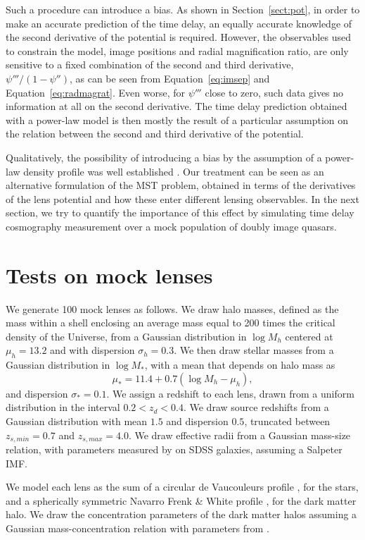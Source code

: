 \documentclass[usenatbib]{mnras}
\def\psiii{\psi''}
\def\psiiii{\psi'''}
\def\Sref#1{Section~\ref{#1}\xspace}
\def\Eref#1{Equation~\ref{#1}\xspace}
\begin{document}
Such a procedure can introduce a bias. As shown in \Sref{sect:pot}, in order to make an accurate prediction of the time delay, an equally accurate knowledge of the second derivative of the potential is required. However, the observables used to constrain the model, image positions and radial magnification ratio, are only sensitive to a fixed combination of the second and third derivative, $\psiiii/(1-\psiii)$, as can be seen from \Eref{eq:imsep} and \Eref{eq:radmagrat}.
Even worse, for $\psiiii$ close to zero, such data gives no information at all on the second derivative.
The time delay prediction obtained with a power-law model is then mostly the result of a particular assumption on the relation between the second and third derivative of the potential.

Qualitatively, the possibility of introducing a bias by the assumption of a power-law density profile was well established \citep{S+S13}.
Our treatment can be seen as an alternative formulation of the MST problem, obtained in terms of the derivatives of the lens potential and how these enter different lensing observables.
In the next section, we try to quantify the importance of this effect by simulating time delay cosmography measurement over a mock population of doubly image quasars.

\section{Tests on mock lenses}

We generate 100 mock lenses as follows. We draw halo masses, defined as the mass within a shell enclosing an average mass equal to 200 times the critical density of the Universe, from a Gaussian distribution in $\log{M_h}$ centered at $\mu_h=13.2$ and with dispersion $\sigma_h=0.3$. We then draw stellar masses from a Gaussian distribution in $\log{M_*}$, with a mean that depends on halo mass as
\begin{equation}
\mu_* = 11.4 + 0.7(\log{M_h} - \mu_h),
\end{equation}
and dispersion $\sigma_*=0.1$.
We assign a redshift to each lens, drawn from a uniform distribution in the interval $0.2 < z_d < 0.4$. We draw source redshifts from a Gaussian distribution with mean $1.5$ and dispersion $0.5$, truncated between $z_{s,min}=0.7$ and $z_{s,max}=4.0$.
We draw effective radii from a Gaussian mass-size relation, with parameters measured by \citet{New++12} on SDSS galaxies, assuming a Salpeter IMF.

We model each lens as the sum of a circular de Vaucouleurs profile \citep{deV48}, for the stars, and a spherically symmetric Navarro Frenk \& White profile \citep[NFW][]{NFW97}, for the dark matter halo.
We draw the concentration parameters of the dark matter halos assuming a Gaussian mass-concentration relation with parameters from \citet{Mac++08}.
\end{document}
